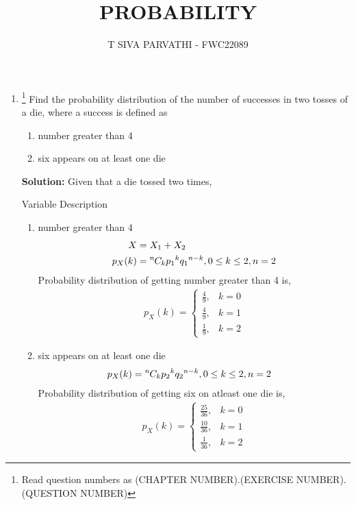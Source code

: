 \documentclass{article}
\newcommand{\solution}{\noindent \textbf{Solution: }}
\newcommand*{\permcomb}[4][0mu]{{{}^{#3}\mkern#1#2_{#4}}}
\newcommand*{\comb}[1][-1mu]{\permcomb[#1]{C}}
\begin{document}
\title{PROBABILITY}
\author{\Large T SIVA PARVATHI - FWC22089}
\date{}

\maketitle
\begin{enumerate}[label=13.\arabic{enumi}.\arabic{enumii}]%
\setcounter{enumi}{3}
\setcounter{enumii}{5}

\item \footnote{Read question numbers as (CHAPTER NUMBER).(EXERCISE NUMBER).(QUESTION NUMBER)}
Find the probability distribution of the number of successes in two tosses of a die, where a success is defined as
\begin{enumerate}
\item number greater than 4
\item six appears on at least one die
\end{enumerate}

\solution
Given that a die tossed two times,
\begin{table}[h]\centering
	
	 \caption{Variable Description}\label{tab:}
\end{table}

\begin{enumerate}
\item number greater than 4
\begin{align}
X&=X_1+X_2\\
p_X(k)&=\comb{n}{k}{p_1}^{k}{q_1}^{n-k}, 0\le k\le 2,n=2
\end{align}
Probability distribution of getting number greater than 4 is,
\begin{align}
  p_X(k) =
    \begin{cases}
      \frac{4}{9}, &  k = 0\\
      \frac{4}{9}, & k = 1\\
      \frac{1}{9}, & k = 2
    \end{cases}       
\end{align}
\item six appears on at least one die
\begin{align}
p_X(k)&=\comb{n}{k}{p_2}^{k}{q_2}^{n-k}, 0\le k\le 2,n=2
\end{align}
Probability distribution of getting six on atleast one die is,
\begin{align}
  p_X(k) =
    \begin{cases}
      \frac{25}{36}, &  k = 0\\
      \frac{10}{36}, & k = 1\\
      \frac{1}{36}, & k = 2
    \end{cases}       
\end{align}
\end{enumerate}
\end{enumerate}
\end{document}
